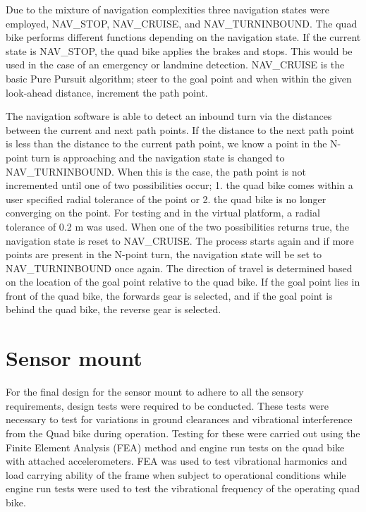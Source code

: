 \documentclass[main.tex]{subfiles}
\begin{document}
Due to the mixture of navigation complexities three navigation states were employed, NAV\_STOP, NAV\_CRUISE, and NAV\_TURNINBOUND. The quad bike performs different functions depending on the navigation state. If the current state is NAV\_STOP, the quad bike applies the brakes and stops. This would be used in the case of an emergency or landmine detection. NAV\_CRUISE is the basic Pure Pursuit algorithm; steer to the goal point and when within the given look-ahead distance, increment the path point.

The navigation software is able to detect an inbound turn via the distances between the current and next path points. If the distance to the next path point is less than the distance to the current path point, we know a point in the N-point turn is approaching and the navigation state is changed to NAV\_TURNINBOUND. When this is the case, the path point is not incremented until one of two possibilities occur; 1. the quad bike comes within a user specified radial tolerance of the point or 2. the quad bike is no longer converging on the point. For testing and in the virtual platform, a radial tolerance of 0.2 m was used. When one of the two possibilities returns true, the navigation state is reset to NAV\_CRUISE. The process starts again and if more points are present in the N-point turn, the navigation state will be set to NAV\_TURNINBOUND once again. The direction of travel is determined based on the location of the goal point relative to the quad bike. If the goal point lies in front of the quad bike, the forwards gear is selected, and if the goal point is behind the quad bike, the reverse gear is selected.

\section{Sensor mount}
For the final design for the sensor mount to adhere to all the sensory requirements, design tests were required to be conducted. These tests were necessary to test for variations in ground clearances and vibrational interference from the Quad bike during operation. Testing for these were carried out using the Finite Element Analysis (FEA) method and engine run tests on the quad bike with attached accelerometers. FEA was used to test vibrational harmonics and load carrying ability of the frame when subject to operational conditions while engine run tests were used to test the vibrational frequency of the operating quad bike. 
\end{document}
